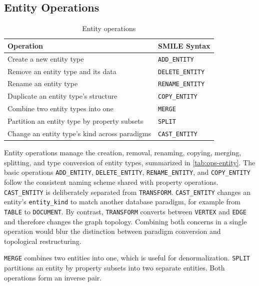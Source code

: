 \subsection{Entity Operations}\label{subsec:op-entity}
  \begin{table}[h]
  \centering
  \small
  \begin{tabular}{ll}
  \toprule
  \textbf{Operation} & \textbf{SMILE Syntax} \\
  \midrule
  Create a new entity type                        & \texttt{ADD\_ENTITY}    \\
  Remove an entity type and its data              & \texttt{DELETE\_ENTITY} \\
  Rename an entity type                           & \texttt{RENAME\_ENTITY} \\
  Duplicate an entity type's structure            & \texttt{COPY\_ENTITY}   \\
  Combine two entity types into one               & \texttt{MERGE}          \\
  Partition an entity type by property subsets    & \texttt{SPLIT}          \\
  Change an entity type's kind across paradigms   & \texttt{CAST\_ENTITY}   \\
  \bottomrule
  \end{tabular}
  \caption{Entity operations}
  \label{tab:ops-entity}
  \end{table}
  Entity operations manage the creation, removal, renaming, copying, merging, splitting, and type conversion of entity types, summarized in \autoref{tab:ops-entity}. The basic operations
  \texttt{ADD\_ENTITY}, \texttt{DELETE\_ENTITY}, \texttt{RENAME\_ENTITY}, and \texttt{COPY\_ENTITY} follow the consistent naming scheme shared with
  property operations.
     \texttt{CAST\_ENTITY} is deliberately separated from \texttt{TRANSFORM}. \texttt{CAST\_ENTITY} changes an entity's \texttt{entity\_kind} to match
  another database paradigm, for example from \texttt{TABLE} to \texttt{DOCUMENT}. By contrast, \texttt{TRANSFORM} converts between \texttt{VERTEX}
  and \texttt{EDGE} and therefore changes the graph topology. Combining both concerns in a single operation would blur the distinction between
  paradigm conversion and topological restructuring.

  \texttt{MERGE} combines two entities into one, which is useful for denormalization. \texttt{SPLIT} partitions an entity by property subsets into
  two separate entities. Both operations form an inverse pair.


